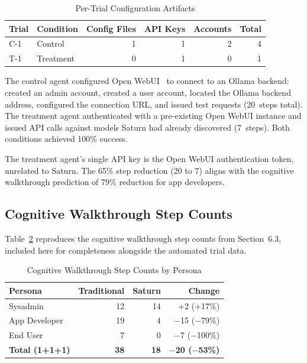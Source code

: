 \begin{table}[ht]
\centering
\caption{Per-Trial Configuration Artifacts}
\label{tab:raw-c2-artifacts}
\begin{tabular}{l l r r r r}
\hline
\textbf{Trial} & \textbf{Condition} & \textbf{Config Files} & \textbf{API Keys} & \textbf{Accounts} & \textbf{Total} \\
\hline
C-1 & Control & 1 & 1 & 2 & 4 \\
T-1 & Treatment & 0 & 1 & 0 & 1 \\
\hline
\end{tabular}
\end{table}

The control agent configured Open WebUI~\cite{open-webui} to connect to an Ollama backend: created an admin account, created a user account, located the Ollama backend address, configured the connection URL, and issued test requests (20~steps total). The treatment agent authenticated with a pre-existing Open WebUI instance and issued API calls against models Saturn had already discovered (7~steps). Both conditions achieved 100\% success.

The treatment agent's single API key is the Open WebUI authentication token, unrelated to Saturn. The 65\% step reduction (20 to 7) aligns with the cognitive walkthrough prediction of 79\% reduction for app developers.

\subsection{Cognitive Walkthrough Step Counts}

Table~\ref{tab:cog-steps} reproduces the cognitive walkthrough step counts from Section~6.3, included here for completeness alongside the automated trial data.

\begin{table}[ht]
\centering
\caption{Cognitive Walkthrough Step Counts by Persona}
\label{tab:cog-steps}
\begin{tabular}{l r r r}
\hline
\textbf{Persona} & \textbf{Traditional} & \textbf{Saturn} & \textbf{Change} \\
\hline
Sysadmin & 12 & 14 & +2 (+17\%) \\
App Developer & 19 & 4 & $-$15 ($-$79\%) \\
End User & 7 & 0 & $-$7 ($-$100\%) \\
\hline
\textbf{Total (1+1+1)} & \textbf{38} & \textbf{18} & $-$\textbf{20 ($-$53\%)} \\
\hline
\end{tabular}
\end{table}

